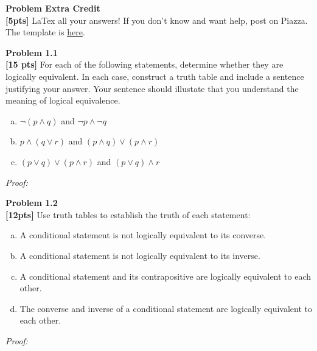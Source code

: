 \documentclass{article}
\newenvironment{problem}[2][Problem]
    { \begin{mdframed}[backgroundcolor=gray!20] \textbf{#1 #2} \\}
    {  \end{mdframed}}
\newenvironment{solution}
    {\textit{Proof:}}
    {}
\begin{document}
\begin{problem}{Extra Credit}
\textbf{[5pts]} LaTex all your answers! If you don't know and want help, post on Piazza. The template is \href{https://github.com/jmbhughes/CSCI2824-Discrete-Structures/blob/master/homework/hw1.tex}{here}.  
\end{problem}

\begin{problem}{1.1}
\textbf{[15 pts]} For each of the following statements, determine whether they are logically equivalent. In each case, construct a truth table and include a sentence justifying your answer. Your sentence should illustate that you understand the meaning of logical equivalence. 
\begin{enumerate}[a)]
    \item $\neg(p \land q)$ and $\neg p \land \neg q$
    \item $p \land (q \lor r)$ and $(p \land q) \lor (p \land r)$
    \item $(p \lor q) \lor (p \land r)$ and $(p \lor q) \land r$
\end{enumerate}
\end{problem}

\begin{solution}
\end{solution}
\newpage  %

\begin{problem}{1.2}
\textbf{[12pts]} Use truth tables to establish the truth of each statement:
\begin{enumerate}[a)]
\item A conditional statement is not logically equivalent to its converse.
\item A conditional statement is not logically equivalent to its inverse.
\item A conditional statement and its contrapositive are logically equivalent to each other.
\item The converse and inverse of a conditional statement are logically equivalent to each other.
\end{enumerate}
\end{problem}

\begin{solution}
\end{solution}
\newpage %
\end{document}
